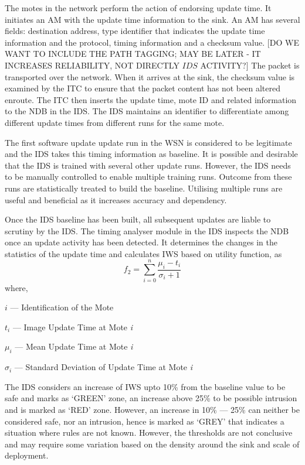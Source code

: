 \documentclass[conference,final]{IEEEtran}
\begin{document}
The motes in the network perform the action of endorsing update time. 
It initiates an AM with the update time information to the sink. 
An AM has several fields: destination address, type identifier that indicates the update time information and the protocol, timing information and a checksum value.
[DO WE WANT TO INCLUDE THE PATH TAGGING; MAY BE LATER - IT INCREASES RELIABILITY, NOT DIRECTLY $IDS$ ACTIVITY?]
The packet is transported over the network.
When it arrives at the sink, the checksum value is examined by the ITC to ensure that the packet content has not been altered enroute.
The ITC then inserts the update time, mote ID and related information to the NDB in the IDS.
The IDS maintains an identifier to differentiate among different update times from different runs for the same mote.

The first software update update run in the WSN is considered to be legitimate and the IDS takes this timing information as baseline.
It is possible and desirable that the IDS is trained with several other update runs.
However, the IDS needs to be manually controlled to enable multiple training runs.
Outcome from these runs are statistically treated to build the baseline.
Utilising multiple runs are useful and beneficial as it increases accuracy and dependency.

Once the IDS baseline has been built, all subsequent updates are liable to scrutiny by the IDS.
The timing analyser module in the IDS inspects the NDB once an update activity has been detected.
It determines the changes in the statistics of the update time and calculates IWS based on utility function, as
\begin{equation}
\label{eqn2} 
	f_2 = \sum \limits_{i=0}^{n} \frac{\mu_i - t_i }{\sigma_i + 1}
\end{equation}
where, 

	\hspace {2cm} $i$ --- Identification of the Mote  
	
	\hspace {2cm} $t_i$ --- Image Update Time at Mote \emph{i} 
	
	\hspace {2cm} $\mu_i$ --- Mean Update Time at Mote \emph{i} 
	
	\hspace {2cm} $\sigma_i$ --- Standard Deviation of Update Time at Mote \emph{i} 
	
The IDS considers an increase of IWS upto 10\% from the baseline value to be safe and marks as `GREEN' zone, an increase above 25\% to be possible intrusion and is marked as `RED' zone.
However, an increase in 10\% --- 25\% can neither be considered safe, nor an intrusion, hence is marked as `GREY' that indicates a situation where rules are not known.
However, the thresholds are not conclusive and may require some variation based on the density around the sink and scale of deployment.
\end{document}

